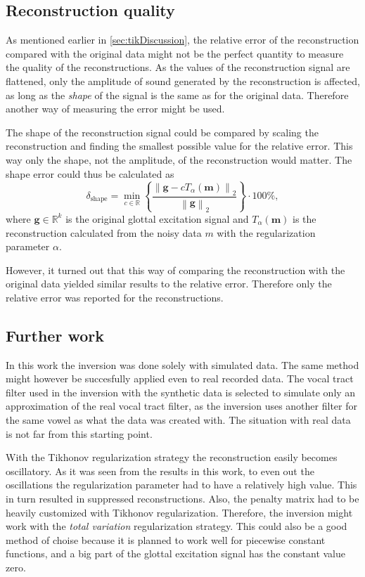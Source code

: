 \documentclass[12pt,a4]{article}
\newcommand{\R}{{\mathbb R}}
\newcommand{\vc}[1]{\ensuremath{\bm{#1}}}
\begin{document}
\subsection{Reconstruction quality}
\label{sec:recQuality}

As mentioned earlier in \cref{sec:tikDiscussion}, the relative error of the reconstruction compared with the original data might not be the perfect quantity to measure the quality of the reconstructions. As the values of the reconstruction signal are flattened, only the amplitude of sound generated by the reconstruction is affected, as long as the \emph{shape} of the signal is the same as for the original data. Therefore another way of measuring the error might be used.

The shape of the reconstruction signal could be compared by scaling the reconstruction and finding the smallest possible value for the relative error. This way only the shape, not the amplitude, of the reconstruction would matter. The shape error could thus be calculated as
\begin{equation}
\delta_{\text{shape}} = \min_{c \in \R} \left\{ \frac{\left\| \vc{g} - c T_{\alpha}(\vc{m}) \right\|_2}{\left\| \vc{g} \right\|_2} \right\} \cdot 100 \% ,
\end{equation}
where $\vc{g} \in \R^k$ is the original glottal excitation signal and $T_{\alpha}(\vc{m})$ is the reconstruction calculated from the noisy data $m$ with the regularization parameter $\alpha$.

However, it turned out that this way of comparing the reconstruction with the original data yielded similar results to the relative error. Therefore only the relative error was reported for the reconstructions.

\subsection{Further work}

In this work the inversion was done solely with simulated data. The same method might however be succesfully applied even to real recorded data. The vocal tract filter used in the inversion with the synthetic data is selected to simulate only an approximation of the real vocal tract filter, as the inversion uses another filter for the same vowel as what the data was created with. The situation with real data is not far from this starting point.

With the Tikhonov regularization strategy the reconstruction easily becomes oscillatory. As it was seen from the results in this work, to even out the oscillations the regularization parameter had to have a relatively high value. This in turn resulted in suppressed reconstructions. Also, the penalty matrix had to be heavily customized with Tikhonov regularization. Therefore, the inversion might work with the \emph{total variation} regularization strategy.\cite{samu} This could also be a good method of choise because it is planned to work well for piecewise constant functions, and a big part of the glottal excitation signal has the constant value zero.
\end{document}
